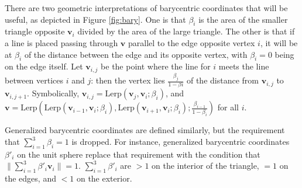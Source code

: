 \documentclass{amsart}[12pt]
\begin{document}
There are two geometric interpretations of barycentric coordinates that will be
useful, as depicted in Figure \ref{fig:bary}. One is that $\beta_i$ is the area
of the smaller triangle opposite $\mathbf v_i$ divided by the area of the large
triangle.
The other is that if a line is placed passing through $\mathbf v$ parallel to
the edge opposite vertex $i$, it will be at $\beta_i$ of the distance between
the edge and its opposite vertex, with $\beta_i = 0$ being on the edge itself.
Let $\mathbf v_{i,j}$ be the point where the line for $i$ meets the line between
vertices $i$ and $j$: then the vertex lies $\frac{\beta_{j}}{1-\beta{i}}$
of the distance from $\mathbf v_{i,j}$ to $\mathbf v_{i,j+1}$. Symbolically,
$\mathbf v_{i,j} = \mathrm{Lerp}(\mathbf v_{j},\mathbf v_i;\beta_{i})$, and
$\mathbf v = \mathrm{Lerp}(\mathrm{Lerp}(\mathbf v_{i-1}, \mathbf v_i;
\beta_{i}), \mathrm{Lerp}(\mathbf v_{i+1}, \mathbf v_i; \beta_{i});
\frac{\beta_{i-1}}{1-\beta_{i}})$ for all $i$.

Generalized barycentric coordinates are defined similarly, but the requirement
that $\sum^3_{i=1} \beta_i = 1$ is dropped. For instance, generalized
barycentric coordinates $\beta'_i$ on the unit sphere replace that requirement
with the condition that $\| \sum^3_{i=1} \beta'_i \mathbf v_i \| = 1$.
$\sum^3_{i=1} \beta'_i$ are $>1$ on the interior of the triangle,
$=1$ on the edges, and $<1$ on the exterior.
\end{document}
